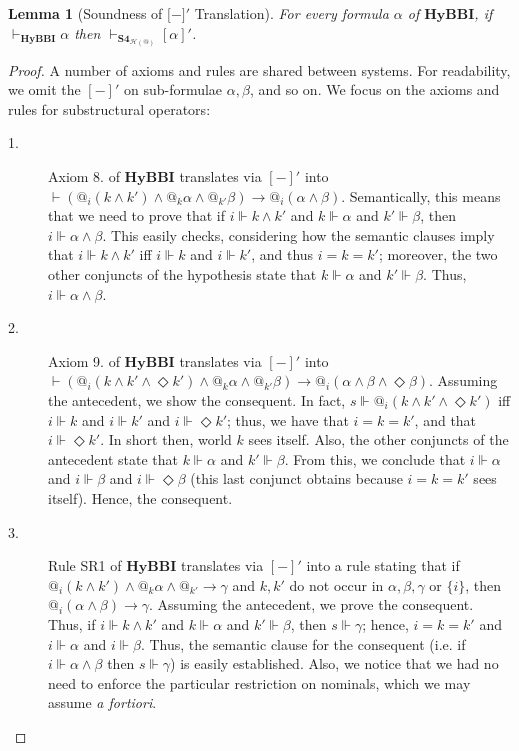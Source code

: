 \documentclass[a4paper]{article}
\newtheorem{lemma}[theorem]{Lemma}
\newcommand{\SFour}{\textbf{S4}\xspace}
\newcommand{\rev}[1]{[#1]'}
\begin{document}
\begin{lemma}[Soundness of ${[}-{]}'$ Translation]\label{Theor:Faithfulnes_1_HyBBI}
For every formula $\alpha$ of $\textbf{HyBBI}$, if $\vdash_{\textbf{HyBBI}} \alpha$ then $\vdash_{\SFour_{\mathcal{H}(@)}} [\alpha]'$.

\end{lemma}
\begin{proof}
  A number of axioms and rules are shared between systems. For readability, we omit the $\rev{-}$ on sub-formulae $\alpha, \beta$, and so on. We focus on the axioms and rules for substructural operators:

    \begin{description}
        \item[1.] Axiom 8. of $\textbf{HyBBI}$ translates via $\rev{-}$ into $\vdash (@_i (k\land k')\land @_k\alpha\land@_{k'}\beta) \rightarrow @_i(\alpha \land \beta)$. Semantically, this means that we need to prove that if $i\Vdash k \land k'$ and $k \Vdash \alpha$ and $k'\Vdash \beta$, then $i\Vdash \alpha \land \beta$. This easily checks, considering how the semantic clauses imply that $i\Vdash k \land k'$ iff $i\Vdash k$ and $i \Vdash k'$, and thus $i=k=k'$; moreover, the two other conjuncts of the hypothesis state that $k\Vdash \alpha$ and $k'\Vdash \beta$. Thus, $i \Vdash \alpha \land \beta$.

        \item[2.] Axiom 9. of $\textbf{HyBBI}$ translates via $\rev{-}$ into $\vdash (@_i (k\land k' \land \Diamond k')\land @_k\alpha\land@_{k'}\beta) \rightarrow @_i(\alpha \land \beta \land \Diamond \beta)$. Assuming the antecedent, we show the consequent. In fact, $s\Vdash @_i (k\land k'\land \Diamond k')$ iff $i\Vdash k$ and $i\Vdash k'$ and $i\Vdash \Diamond k'$; thus, we have that $i=k=k'$, and that $i\Vdash \Diamond k'$. In short then, world $k$ sees itself. Also, the other conjuncts of the antecedent state that $k\Vdash \alpha$ and $k'\Vdash \beta$. From this, we conclude that $i\Vdash \alpha$ and $i \Vdash \beta$ and $i\Vdash \Diamond \beta$ (this last conjunct obtains because $i=k=k'$ sees itself). Hence, the consequent.

        \item[3.] Rule SR1 of $\textbf{HyBBI}$ translates via $\rev{-}$ into a rule stating that if $@_i(k\land k')\land @_k\alpha \land @_{k'}\rightarrow \gamma$ and $k, k'$ do not occur in $\alpha, \beta,\gamma$ or $\{i\}$, then $@_i(\alpha \land \beta) \rightarrow \gamma$. Assuming the antecedent, we prove the consequent. Thus, if $i\Vdash k \land k'$ and $k\Vdash \alpha$ and $k'\Vdash \beta$, then $s \Vdash \gamma$; hence, $i=k=k'$ and $i\Vdash \alpha$ and $i\Vdash \beta$. Thus, the semantic clause for the consequent (i.e. if $i\Vdash \alpha \land \beta$ then $s\Vdash \gamma$) is easily established. Also, we notice that we had no need to enforce the particular restriction on nominals, which we may assume \textit{a fortiori}.


\end{description}
\end{proof}
\end{document}
